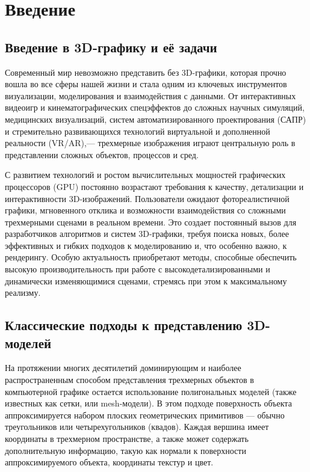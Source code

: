 \section{Введение}
\label{sec:Chapter0}

\subsection{Введение в 3D-графику и её задачи}
Современный мир невозможно представить без 3D-графики, которая прочно вошла во все сферы нашей жизни и стала одним из ключевых инструментов визуализации, моделирования и взаимодействия с данными. От интерактивных видеоигр и кинематографических спецэффектов до сложных научных симуляций, медицинских визуализаций, систем автоматизированного проектирования (САПР) и стремительно развивающихся технологий виртуальной и дополненной реальности (VR/AR),--- трехмерные изображения играют центральную роль в представлении сложных объектов, процессов и сред.

С развитием технологий и ростом вычислительных мощностей графических процессоров (GPU) постоянно возрастают требования к качеству, детализации и интерактивности 3D-изображений. Пользователи ожидают фотореалистичной графики, мгновенного отклика и возможности взаимодействия со сложными трехмерными сценами в реальном времени. Это создает постоянный вызов для разработчиков алгоритмов и систем 3D-графики, требуя поиска новых, более эффективных и гибких подходов к моделированию и, что особенно важно, к рендерингу. Особую актуальность приобретают методы, способные обеспечить высокую производительность при работе с высокодетализированными и динамически изменяющимися сценами, стремясь при этом к максимальному реализму.

\subsection{Классические подходы к представлению 3D-моделей}

На протяжении многих десятилетий доминирующим и наиболее распространенным способом представления трехмерных объектов в компьютерной графике остается использование полигональных моделей (также известных как сетки, или mesh-модели). В этом подходе поверхность объекта аппроксимируется набором плоских геометрических примитивов --- обычно треугольников или четырехугольников (квадов). Каждая вершина имеет координаты в трехмерном пространстве, а также может содержать дополнительную информацию, такую как нормали к поверхности аппроксимируемого объекта, координаты текстур и цвет.

